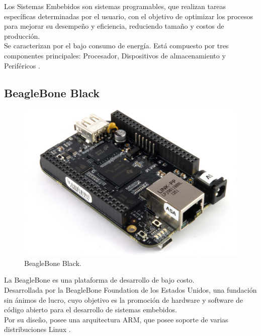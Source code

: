 Los Sistemas Embebidos son sistemas programables, que realizan tareas específicas determinadas por el usuario, con el objetivo de optimizar los procesos para mejorar su desempeño y eficiencia, reduciendo tamaño y costos de producción. \\

Se caracterizan por el bajo consumo de energía. Está compuesto por tres componentes principales: Procesador, Dispositivos de almacenamiento y Periféricos \citep{caballero2014desarrollo}.

\subsection{BeagleBone Black}

\begin{figure}[ht]
\centering
\includegraphics[scale=0.36]{Figures/BeagleBoneBlack}
\caption[BeagleBone Black.]{BeagleBone Black\footnotemark.}
\label{fig:BBlack}
\end{figure}


La BeagleBone es una plataforma de desarrollo de bajo costo. \\

Desarrollada por la BeagleBone Foundation de los Estados Unidos, una fundación sin ánimos de lucro, cuyo objetivo es la promoción de hardware y software de código abierto para el desarrollo de sistemas embebidos. \\

Por su diseño, posee una arquitectura ARM, que posee soporte de varias distribuciones Linux \citep{coronado2014desarrollo}. \\


